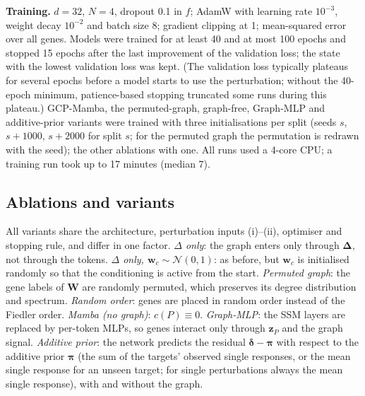 \documentclass{bioinfo}
\begin{document}
\textbf{Training.} $d=32$, $N=4$, dropout 0.1 in $f$; AdamW \citep{loshchilov2019} with learning
rate $10^{-3}$, weight decay $10^{-2}$ and batch size 8; gradient clipping at 1; mean-squared error
over all genes. Models were trained for at least 40 and at most 100 epochs and stopped 15 epochs
after the last improvement of the validation loss; the state with the lowest validation loss was
kept. (The validation loss typically plateaus for several epochs before a model starts to use the
perturbation; without the 40-epoch minimum, patience-based stopping truncated some runs during
this plateau.) GCP-Mamba, the permuted-graph, graph-free, Graph-MLP and additive-prior variants were
trained with three initialisations per split (seeds $s$, $s+1000$, $s+2000$ for split $s$; for the
permuted graph the permutation is redrawn with the seed); the other ablations with one. All runs used a 4-core CPU; a training run
took up to 17 minutes (median 7).

\subsection{Ablations and variants}
All variants share the architecture, perturbation inputs (i)--(ii), optimiser and stopping rule, and
differ in one factor. \emph{$\Delta$ only}: the graph enters only through $\bm\Delta$, not through the
tokens. \emph{$\Delta$ only, $\mathbf{w}_c\sim\mathcal{N}(0,1)$}: as before, but $\mathbf{w}_c$ is
initialised randomly so that the conditioning is active from the start. \emph{Permuted graph}: the gene
labels of $\mathbf{W}$ are randomly permuted, which preserves its degree distribution and spectrum.
\emph{Random order}: genes are placed in random order instead of the Fiedler order. \emph{Mamba (no
graph)}: $c(P)\equiv0$. \emph{Graph-MLP}: the SSM layers are replaced by per-token MLPs, so genes
interact only through $\mathbf{z}_P$ and the graph signal. \emph{Additive prior}: the network predicts
the residual $\bm{\delta}-\bm{\pi}$ with respect to the additive prior $\bm{\pi}$ (the sum of the
targets' observed single responses, or the mean single response for an unseen target; for single
perturbations always the mean single response), with and without the graph.
\end{document}
